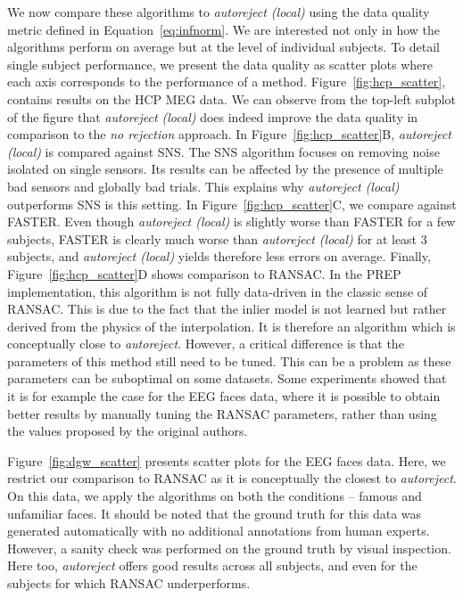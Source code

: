 We now compare these algorithms to \emph{autoreject (local)} using the data quality metric defined in Equation~\eqref{eq:infnorm}. We are interested not only in how the algorithms perform on average but at the level of individual subjects. To detail single subject performance, we present the data quality as scatter plots where each axis corresponds to the performance of a method. Figure~\ref{fig:hcp_scatter}, contains results on the HCP MEG data. We can observe from the top-left subplot of the figure that \emph{autoreject (local)} does indeed improve the data quality in comparison to the \emph{no rejection} approach. In Figure~\ref{fig:hcp_scatter}B, \emph{autoreject (local)} is compared against SNS. The SNS algorithm focuses on removing noise isolated on single sensors. Its results can be affected by the presence of multiple bad sensors and globally bad trials. This explains why \emph{autoreject (local)} outperforms SNS is this setting. In Figure~\ref{fig:hcp_scatter}C, we compare against FASTER. Even though \emph{autoreject (local)} is slightly worse than FASTER for a few subjects, FASTER is clearly much worse than \emph{autoreject (local)} for at least 3 subjects, and \emph{autoreject (local)} yields therefore less errors on average. Finally, Figure~\ref{fig:hcp_scatter}D shows comparison to RANSAC. In the PREP implementation, this algorithm is not fully data-driven in the classic sense of RANSAC. This is due to the fact that the inlier model is not learned but rather derived from the physics of the interpolation. It is therefore an algorithm which is conceptually close to \emph{autoreject}. However, a critical difference is that the parameters of this method still need to be tuned. This can be a problem as these parameters can be suboptimal on some datasets. Some experiments showed that it is for example the case for the EEG faces data, where it is possible to obtain better results by manually tuning the RANSAC parameters, rather than using the values proposed by the original authors.

Figure~\ref{fig:dgw_scatter} presents scatter plots for the EEG faces data.
%
Here, we restrict our comparison to RANSAC as it is conceptually the closest to \emph{autoreject}. On this data, we apply the algorithms on both the conditions -- famous and unfamiliar faces. It should be noted that the ground truth for this data was generated automatically with no additional annotations from human experts. However, a sanity check was performed on the ground truth by visual inspection. Here too, \emph{autoreject} offers good results across all subjects, and even for the subjects for which RANSAC underperforms.

